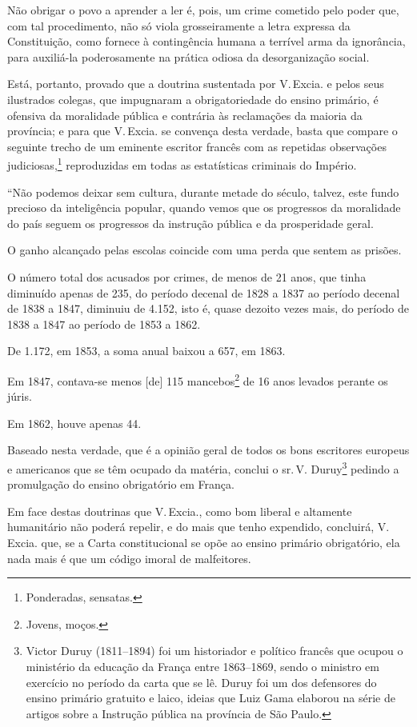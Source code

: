 Não obrigar o povo a aprender a ler é, pois, um crime cometido pelo
poder que, com tal procedimento, não só viola grosseiramente a letra
expressa da Constituição, como fornece à contingência humana a terrível
arma da ignorância, para auxiliá-la poderosamente na prática odiosa da
desorganização social.

Está, portanto, provado que a doutrina sustentada por V.\,Excia. e pelos
seus ilustrados colegas, que impugnaram a obrigatoriedade do ensino
primário, é ofensiva da moralidade pública e contrária às reclamações da
maioria da província; e para que V.\,Excia. se convença desta verdade,
basta que compare o seguinte trecho de um eminente escritor francês com
as repetidas observações judiciosas,\footnote{Ponderadas, sensatas.}
reproduzidas em todas as estatísticas criminais do Império.

``Não podemos deixar sem cultura, durante metade do século, talvez, este %
fundo precioso da inteligência popular, quando vemos que os progressos
da moralidade do país seguem os progressos da instrução pública e da
prosperidade geral.

O ganho alcançado pelas escolas coincide com uma perda que sentem as
prisões.

O número total dos acusados por crimes, de menos de 21 anos, que tinha
diminuído apenas de 235, do período decenal de 1828 a 1837 ao período
decenal de 1838 a 1847, diminuiu de 4.152, isto é, quase dezoito vezes
mais, do período de 1838 a 1847 ao período de 1853 a 1862.

De 1.172, em 1853, a soma anual baixou a 657, em 1863.

Em 1847, contava-se menos {[}de{]} 115 mancebos\footnote{Jovens,
  moços.} de 16 anos levados perante os júris.

Em 1862, houve apenas 44.

Baseado nesta verdade, que é a opinião geral de todos os bons escritores
europeus e americanos que se têm ocupado da matéria, conclui o sr.\,V.
Duruy\footnote{Victor Duruy (1811--1894) foi um historiador e político
  francês que ocupou o ministério da educação da França entre 1863--1869,
  sendo o ministro em exercício no período da carta que se lê. Duruy foi
  um dos defensores do ensino primário gratuito e laico, ideias que Luiz
  Gama elaborou na série de artigos sobre a Instrução pública na
  província de São Paulo.\label{duruy}} pedindo a promulgação do ensino obrigatório
em França.

Em face destas doutrinas que V.\,Excia., como bom liberal e altamente
humanitário não poderá repelir, e do mais que tenho expendido,
concluirá, V.\,Excia. que, se a Carta constitucional se opõe ao ensino
primário obrigatório, ela nada mais é que um código imoral de
malfeitores.

